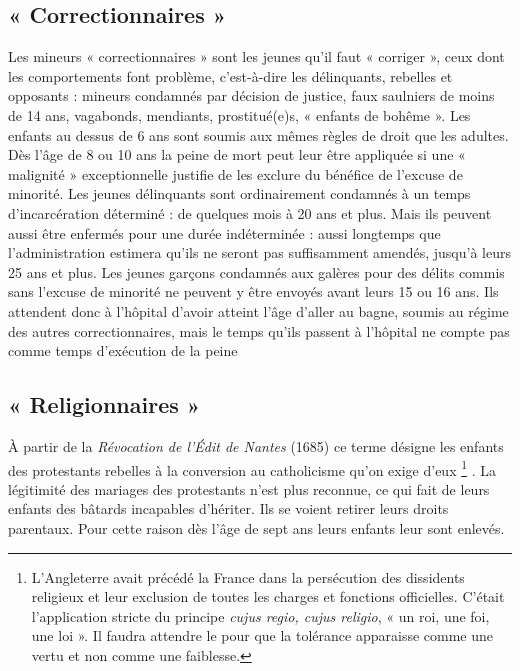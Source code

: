 \subsection{« Correctionnaires »}

Les mineurs « correctionnaires » sont les jeunes qu'il faut « corriger », ceux dont les comportements font problème, c'est-à-dire les délinquants, rebelles et opposants : mineurs condamnés par décision de justice, faux saulniers de moins de 14 ans, vagabonds, mendiants, prostitué(e)s, « enfants de bohême ». Les enfants au dessus de 6 ans sont soumis aux mêmes règles de droit que les adultes. Dès l'âge de 8 ou 10 ans la peine de mort peut leur être appliquée si une « malignité » exceptionnelle justifie de les exclure du bénéfice de l'excuse de minorité. Les jeunes délinquants sont ordinairement condamnés à un temps d'incarcération déterminé : de quelques mois à 20 ans et plus. Mais ils peuvent aussi être enfermés pour une durée indéterminée : aussi longtemps que l'administration estimera qu'ils ne seront pas suffisamment amendés, jusqu'à leurs 25 ans et plus. Les jeunes garçons condamnés aux galères pour des délits commis sans l'excuse de minorité ne peuvent y être envoyés avant leurs 15 ou 16 ans. Ils attendent donc à l'hôpital d'avoir atteint l'âge d'aller au bagne, soumis au régime des autres correctionnaires, mais le temps qu'ils passent à l'hôpital ne compte pas comme temps d'exécution de la peine

\subsection{« Religionnaires »}

À partir de la \emph{Révocation de l'Édit de Nantes} (1685) ce terme désigne les enfants des protestants rebelles à la conversion au catholicisme qu'on exige d'eux%
\footnote{L'Angleterre avait précédé la France dans la persécution des dissidents religieux et leur exclusion de toutes les charges et fonctions officielles. C'était l'application stricte du principe \emph{cujus regio, cujus religio}, « {un roi, une foi, une loi} ». Il faudra attendre le  pour que la tolérance apparaisse comme une vertu et non comme une faiblesse.}%
. La légitimité des mariages des protestants n'est plus reconnue, ce qui fait de leurs enfants des bâtards incapables d'hériter. Ils se voient retirer leurs droits parentaux. Pour cette raison dès l'âge de sept ans leurs enfants leur sont enlevés. 

